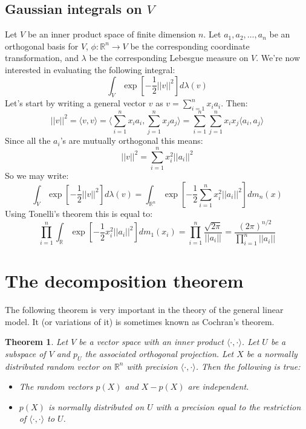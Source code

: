\documentclass[12pt, a4paper]{article}
\newtheorem{theorem}{Theorem}[section]
\numberwithin{equation}{section}
\begin{document}
\subsection{Gaussian integrals on $V$}
Let $V$ be an inner product space of finite dimension $n$. Let $a_1, a_2,\ldots, a_n$ be an orthogonal basis for $V$, $\phi:\mathbb{R}^n\rightarrow V$ be the corresponding coordinate transformation, and $\lambda$ be the corresponding Lebesgue measure on $V$. We're now interested in evaluating the following integral:
\begin{equation}
\int_V\exp\left[-\frac{1}{2}||v||^2\right]d\lambda(v)
\end{equation}
Let's start by writing a general vector $v$ as $v=\sum_{i=1}^n x_i a_i$. Then:
\begin{equation}
||v||^2=\langle v,v\rangle=\langle\sum_{i=1}^n x_i a_i,\sum_{j=1}^n x_j a_j\rangle=\sum_{i=1}^n\sum_{j=1}^n x_i x_j\langle a_i,a_j\rangle
\end{equation}
Since all the $a_i$'s are mutually orthogonal this means:
\begin{equation}
||v||^2=\sum_{i=1}^n x_i^2||a_i||^2
\end{equation}
So we may write:
\begin{equation}
\int_V\exp\left[-\frac{1}{2}||v||^2\right]d\lambda(v)=\int_{\mathbb{R}^n}\exp\left[-\frac{1}{2}\sum_{i=1}^n x_i^2||a_i||^2\right]dm_n(x)
\end{equation}
Using Tonelli's theorem this is equal to:
\begin{equation}
\prod_{i=1}^n\int_\mathbb{R}\exp\left[-\frac{1}{2}x_i^2||a_i||^2\right]dm_1(x_i)=\prod_{i=1}^n\frac{\sqrt{2\pi}}{||a_i||}=\frac{(2\pi)^{n/2}}{\prod_{i=1}^n||a_i||}
\end{equation}

\section{The decomposition theorem}
The following theorem is very important in the theory of the general linear model. It (or variations of it) is sometimes known as Cochran's theorem.
\begin{theorem}
Let $V$ be a vector space with an inner product $\langle\cdot,\cdot\rangle$. Let $U$ be a subspace of $V$ and $p_U$ the associated orthogonal projection. Let $X$ be a normally distributed random vector on $\mathbb{R}^n$ with precision $\langle\cdot,\cdot\rangle$. Then the following is true:
\begin{itemize}
\item The random vectors $p(X)$ and $X-p(X)$ are independent.
\item $p(X)$ is normally distributed on $U$ with a precision equal to the restriction of $\langle\cdot,\cdot\rangle$ to $U$.
\end{itemize}
\end{theorem}
\end{document}
